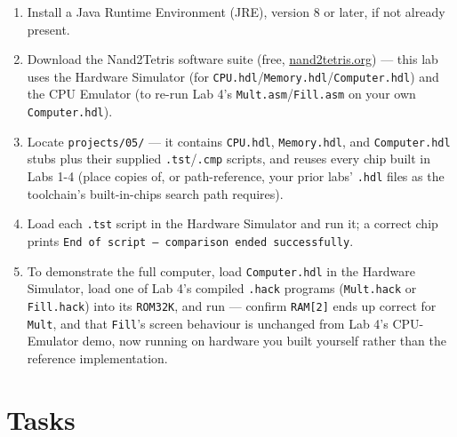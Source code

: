 \documentclass[11pt]{article}
\begin{document}
\begin{enumerate}
  \item Install a Java Runtime Environment (JRE), version 8 or later, if not already present.
  \item Download the Nand2Tetris software suite (free, \url{nand2tetris.org}) --- this lab uses the Hardware Simulator (for \texttt{CPU.hdl}/\texttt{Memory.hdl}/\texttt{Computer.hdl}) and the CPU Emulator (to re-run Lab 4's \texttt{Mult.asm}/\texttt{Fill.asm} on your own \texttt{Computer.hdl}).
  \item Locate \texttt{projects/05/} --- it contains \texttt{CPU.hdl}, \texttt{Memory.hdl}, and \texttt{Computer.hdl} stubs plus their supplied \texttt{.tst}/\texttt{.cmp} scripts, and reuses every chip built in Labs 1-4 (place copies of, or path-reference, your prior labs' \texttt{.hdl} files as the toolchain's built-in-chips search path requires).
  \item Load each \texttt{.tst} script in the Hardware Simulator and run it; a correct chip prints \texttt{End of script --- comparison ended successfully}.
  \item To demonstrate the full computer, load \texttt{Computer.hdl} in the Hardware Simulator, load one of Lab 4's compiled \texttt{.hack} programs (\texttt{Mult.hack} or \texttt{Fill.hack}) into its \texttt{ROM32K}, and run --- confirm \texttt{RAM[2]} ends up correct for \texttt{Mult}, and that \texttt{Fill}'s screen behaviour is unchanged from Lab 4's CPU-Emulator demo, now running on hardware you built yourself rather than the reference implementation.
\end{enumerate}

\section{Tasks}
\label{sec:tasks}
\end{document}
